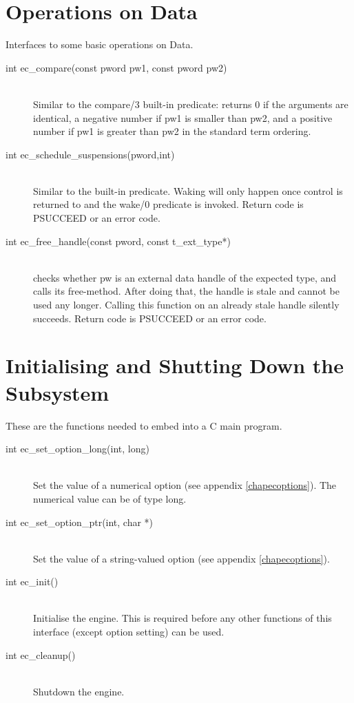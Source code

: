 \section{Operations on {\eclipse} Data}
Interfaces to some basic operations on {\eclipse} Data.
\begin{description}
\item[int		ec_compare(const pword pw1, const pword pw2)]\ \\
	Similar to the compare/3 built-in predicate:
	returns 0 if the arguments are identical,
	a negative number if pw1 is smaller than pw2,
	and a positive number if pw1 is greater than pw2
	in the standard term ordering.

\item[int		ec_schedule_suspensions(pword,int)]\ \\
	Similar to the
	built-in predicate.
	Waking will only happen once control is returned to {\eclipse}
	and the wake/0 predicate is invoked.
	Return code is PSUCCEED or an error code.

\item[int		ec_free_handle(const pword, const t_ext_type*)]\ \\
	checks whether pw is an {\eclipse} external data handle of the
	expected type, and calls its free-method. After doing that, the
	handle is stale and cannot be used any longer. Calling this function
	on an already stale handle silently succeeds.
	Return code is PSUCCEED or an error code.

\end{description}


\section{Initialising and Shutting Down the {\eclipse} Subsystem}
These are the functions needed to embed {\eclipse} into a C main program.
\begin{description}
\item[int		ec_set_option_long(int, long)]\ \\
	Set the value of a numerical option (see appendix \ref{chapecoptions}).
        The numerical value can be of type long.

\item[int		ec_set_option_ptr(int, char *)]\ \\
	Set the value of a string-valued option (see appendix \ref{chapecoptions}).

\item[int		ec_init()]\ \\
	Initialise the {\eclipse} engine. This is required before any other
	functions of this interface (except option setting) can be used.

\item[int		ec_cleanup()]\ \\
	Shutdown the {\eclipse} engine.
\end{description}


